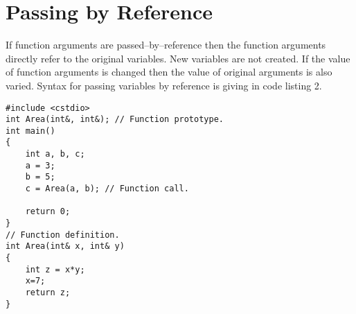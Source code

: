 \documentclass[12pt,a4paper]{article}
\begin{document}
\section{Passing by Reference}
If function arguments are passed--by--reference then the function arguments directly refer to the original variables. New variables are not created. If the value of function arguments is changed then the value of original arguments is also varied. Syntax for passing variables by reference is giving in code listing 2.
\begin{lstlisting}[caption={Passing by reference}]
#include <cstdio>
int Area(int&, int&); // Function prototype.
int main()
{
	int a, b, c;
	a = 3;
	b = 5;
	c = Area(a, b); // Function call.
	
	return 0;
}
// Function definition.
int Area(int& x, int& y)
{
	int z = x*y;
	x=7;
	return z;
}
\end{lstlisting}
\end{document}
